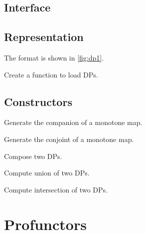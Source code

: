 \label{sec:exercises-DP}

\subsection*{Interface}

\subsection*{Representation}


The format is shown in \cref{fig:dp1}.


\begin{exercise}
  Create a function to load DPs.
%
\end{exercise}

\subsection*{Constructors}


\begin{exercise}
  Generate the companion of a monotone map.
%
\end{exercise}

\begin{exercise}
  Generate the conjoint of a monotone map.
%
%
\end{exercise}





\begin{exercise}
  Compose two DPs.
%
\end{exercise}

\begin{exercise}
  Compute union of two DPs.
%
\end{exercise}

\begin{exercise}
  Compute intersection of two DPs.
%
\end{exercise}


\section{Profunctors}



